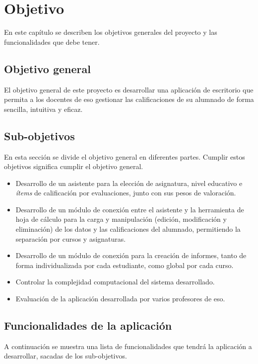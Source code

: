 \chapter{Objetivo}
\label{cap:objetivo}

En este capítulo se describen los objetivos generales del proyecto y las funcionalidades que debe tener.

\section{Objetivo general}
El objetivo general de este proyecto es desarrollar una aplicación de escritorio que permita a los docentes de \gls{eso} gestionar las calificaciones de su alumnado de forma sencilla, intuitiva y eficaz.

\section{Sub-objetivos}
En esta sección se divide el objetivo general en diferentes partes. Cumplir estos objetivos significa cumplir el objetivo general.
\begin{itemize}
	\item Desarrollo de un asistente para la elección de asignatura, nivel educativo e \textit{ítems} de calificación por evaluaciones, junto con sus pesos de valoración. 
	\item Desarrollo de un módulo de conexión entre el asistente y la herramienta de hoja de cálculo para la carga y manipulación (edición, modificación y eliminación) de los datos y las calificaciones del alumnado, permitiendo la separación por cursos y asignaturas.
	\item Desarrollo de un módulo de conexión para la creación de informes, tanto de forma individualizada por cada estudiante, como global por cada curso.
	\item Controlar la complejidad computacional del sistema desarrollado.
	\item Evaluación de la aplicación desarrollada por varios profesores de \gls{eso}.
\end{itemize}	


\section{Funcionalidades de la aplicación} 
\label{funcionalidades}
A continuación se muestra una lista de funcionalidades que tendrá la aplicación a desarrollar, sacadas de los sub-objetivos.

